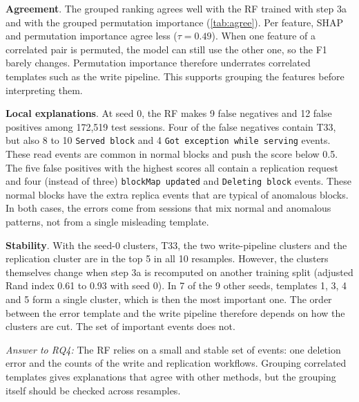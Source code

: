 \documentclass[10pt, conference]{IEEEtran}
\renewcommand{\paragraph}[1]{\noindent\textbf{#1}.}
\newcommand{\tpl}[1]{\texttt{\small #1}}
\begin{document}
\paragraph{Agreement} The grouped ranking agrees well with the RF trained with step 3a and with the grouped permutation importance (\cref{tab:agree}). Per feature, SHAP and permutation importance agree less ($\tau = 0.49$). When one feature of a correlated pair is permuted, the model can still use the other one, so the F1 barely changes. Permutation importance therefore underrates correlated templates such as the write pipeline. This supports grouping the features before interpreting them.

\paragraph{Local explanations} At seed 0, the RF makes 9 false negatives and 12 false positives among 172,519 test sessions. Four of the false negatives contain T33, but also 8 to 10 \tpl{Served block} and 4 \tpl{Got exception while serving} events. These read events are common in normal blocks and push the score below 0.5. The five false positives with the highest scores all contain a replication request and four (instead of three) \tpl{blockMap updated} and \tpl{Deleting block} events. These normal blocks have the extra replica events that are typical of anomalous blocks. In both cases, the errors come from sessions that mix normal and anomalous patterns, not from a single misleading template.

\paragraph{Stability} With the seed-0 clusters, T33, the two write-pipeline clusters and the replication cluster are in the top 5 in all 10 resamples. However, the clusters themselves change when step 3a is recomputed on another training split (adjusted Rand index 0.61 to 0.93 with seed 0). In 7 of the 9 other seeds, templates 1, 3, 4 and 5 form a single cluster, which is then the most important one. The order between the error template and the write pipeline therefore depends on how the clusters are cut. The set of important events does not.

\textit{Answer to RQ4:} The RF relies on a small and stable set of events: one deletion error and the counts of the write and replication workflows. Grouping correlated templates gives explanations that agree with other methods, but the grouping itself should be checked across resamples.
\end{document}
